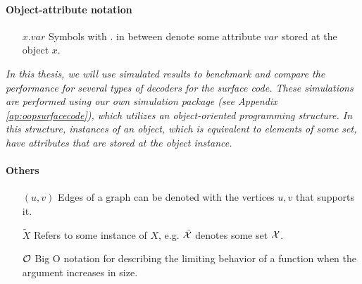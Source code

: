 \paragraph{Object-attribute notation}
\begin{itemize}[leftmargin=4em, align=left]
    \item[$x.var$]  Symbols with $.$ in between denote some attribute $var$ stored at the object $x$.
\end{itemize}
\emph{In this thesis, we will use simulated results to benchmark and compare the performance for several types of decoders for the surface code. These simulations are performed using our own simulation package (see Appendix \ref{ap:oopsurfacecode}), which utilizes an object-oriented programming structure. In this structure, instances of an object, which is equivalent to elements of some set, have attributes that are stored at the object instance.}

\paragraph{Others}
\begin{itemize}[leftmargin=4em, align=left]
    \item[$(u,v)$]  Edges of a graph can be denoted with the vertices $u,v$ that supports it.
    \item[$\tilde{X}$]  Refers to some instance of $X$, e.g. $\tilde{\mathcal{X}}$ denotes some set $\mathcal{X}$. 
    \item[$\mathcal{O}$] Big O notation for describing the limiting behavior of a function when the argument increases in size. 
\end{itemize}






